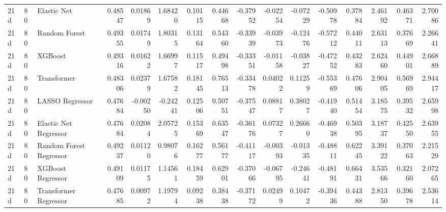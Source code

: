 \begin{tabular}{lllrrrrrrrrrrrrr}
21d & 80 & Elastic Net & 0.48547 & 0.01869 & 1.68420 & 0.10115 & 0.44668 & -0.37952 & -0.02254 & -0.07229 & -0.50978 & 0.37884 & 2.46192 & 0.46371 & 2.70086 \\
21d & 80 & Random Forest & 0.49355 & 0.01749 & 1.80315 & 0.13164 & 0.54360 & -0.33939 & -0.03973 & -0.12476 & -0.57212 & 0.44011 & 2.63113 & 0.37669 & 2.26641 \\
21d & 80 & XGBoost & 0.49316 & 0.01622 & 1.66997 & 0.11517 & 0.49498 & -0.33351 & -0.01158 & -0.03827 & -0.47252 & 0.43283 & 2.62460 & 0.44901 & 2.66889 \\
21d & 80 & Transformer & 0.48306 & 0.02379 & 1.67582 & 0.18145 & 0.76513 & -0.33478 & 0.04022 & 0.11259 & -0.55369 & 0.47606 & 2.90405 & 0.56969 & 2.94417 \\
21d & 80 & LASSO Regressor & 0.47684 & -0.00250 & -0.24241 & 0.12506 & 0.50751 & -0.37547 & 0.08817 & 0.38027 & -0.41940 & 0.51454 & 3.18575 & 0.39532 & 2.65998 \\
21d & 80 & Elastic Net Regressor & 0.47684 & 0.02084 & 2.05725 & 0.15369 & 0.63547 & -0.36176 & 0.07327 & 0.26660 & -0.46938 & 0.50395 & 3.18737 & 0.42550 & 2.63955 \\
21d & 80 & Random Forest Regressor & 0.49237 & 0.01120 & 0.98076 & 0.16277 & 0.56177 & -0.41117 & -0.00393 & -0.01335 & -0.48811 & 0.62245 & 3.39122 & 0.37063 & 2.21529 \\
21d & 80 & XGBoost Regressor & 0.49109 & 0.01175 & 1.14561 & 0.18459 & 0.62901 & -0.37066 & -0.06795 & -0.24641 & -0.48191 & 0.66431 & 3.53566 & 0.32160 & 2.07265 \\
21d & 80 & Transformer Regressor & 0.47685 & 0.00972 & 1.19794 & 0.09238 & 0.38438 & -0.37172 & 0.02499 & 0.10472 & -0.39436 & 0.44388 & 2.81350 & 0.39678 & 2.53614 \\
\bottomrule
\end{tabular}
